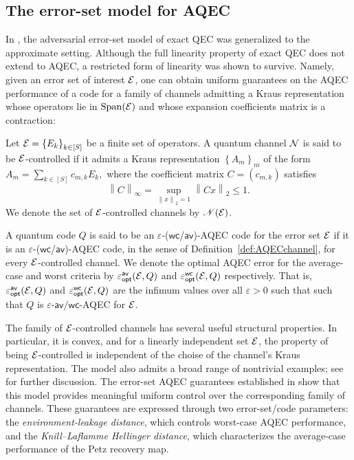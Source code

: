 \documentclass[10pt]{article}
\DeclareMathOperator{\Span}{Span}
\newcommand{\ppp}[1]{\left\{#1\right\}}
\newcommand{\norm}[1]{\left\|#1\right\|}
\newcommand{\s}[1]{\mathsf{#1}}
\begin{document}
\subsection{The error-set model for AQEC} 
In \cite{Elimelech2026Theory}, the adversarial error-set model of exact QEC was generalized to the approximate setting. Although the full linearity property of exact QEC does not extend to AQEC, a restricted form of linearity was shown to survive. Namely, given an error set of interest ${\cal E}$, one can obtain uniform guarantees on the AQEC performance of a code for a family of channels admitting a Kraus representation whose operators lie in $\Span(\calE)$ and whose expansion coefficients matrix is a contraction:
\begin{definition}\label{def:errorSetAQEC} Let $\calE=\ppp{E_k}_{k\in[S]}$ be a finite set of operators. A quantum channel ${\cal N}$ is said to be ${\cal E}$-controlled if it admits a Kraus representation $\ppp{A_m}_{m}$ of the form 
$ A_m=\sum_{k\in[S]}c_{m,k}E_k,$ 
where the coefficient matrix $C=(c_{m,k})$ satisfies 
\[ \norm{C}_{\infty}=\sup_{\norm{x}_2=1}\norm{Cx}_{2}\leq 1. \] 
We denote the set of ${\cal E}$-controlled channels by $\mathscr{N}({\cal E})$.

A quantum code $Q$ is said to be an  $\varepsilon$-($\s{wc}$/$\s{av}$)-AQEC code for the error set ${\cal E}$ if it is an $\varepsilon$-($\s{wc}$/$\s{av}$)-AQEC code, in the sense of Definition~\ref{def:AQECchannel}, for every ${\cal E}$-controlled channel. We denote the optimal AQEC error for the average-case and worst criteria by $\varepsilon_{\s{opt}}^{\s{av}}(\calE,Q)$ and $\varepsilon_{\s{opt}}^{\s{wc}}(\calE,Q)$ respectively. That is, $\varepsilon_{\s{opt}}^{\s{av}}(\calE,Q)$ and $\varepsilon_{\s{opt}}^{\s{wc}}(\calE,Q)$ are the infimum values over all $\varepsilon>0$ such that  such that $Q$ is $\varepsilon$-$\s{av}/\s{wc}$-AQEC for ${\cal E}$.
\end{definition} 

The family of ${\cal E}$-controlled channels  has several useful structural properties. In particular, it is convex, and for a linearly independent set ${\cal E}$, the property of being ${\cal E}$-controlled is independent of the choise of the channel's Kraus representation. The model also admits a broad range of nontrivial examples; see \cite[Section~3.1.1]{Elimelech2026Theory} for further discussion. The error-set AQEC guarantees established in \cite{Elimelech2026Theory} show that this model provides meaningful uniform control over the corresponding family of channels. These guarantees are expressed through two error-set/code parameters: the \emph{environment-leakage distance}, which controls worst-case AQEC performance, and the \emph{Knill--Laflamme Hellinger distance}, which characterizes the average-case performance of the Petz recovery map.
\end{document}
